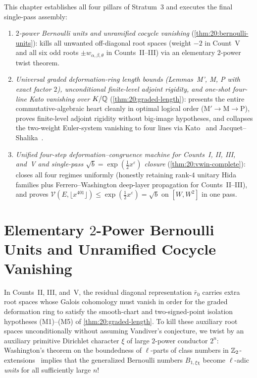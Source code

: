 This chapter establishes all four pillars of Stratum~3 and executes the final single-pass assembly:
\begin{enumerate}[label=(\roman*)]
\item \emph{$2$-power Bernoulli units and unramified cocycle vanishing} (\cref{thm:20:bernoulli-units}): kills all unwanted off-diagonal root spaces (weight $-2$ in Count~V and all six odd roots $\pm w_{\alpha, \beta, \theta}$ in Counts~II--III) via an elementary $2$-power twist theorem.
\item \emph{Universal graded deformation-ring length bounds (Lemmas~M', M, P with exact factor $2$), unconditional finite-level adjoint rigidity, and one-shot four-line Kato vanishing over $K/\mathbb{Q}$} (\cref{thm:20:graded-length}): presents the entire commutative-algebraic heart cleanly in optimal logical order ($\mathrm{M'} \to \mathrm{M} \to \mathrm{P}$), proves finite-level adjoint rigidity without big-image hypotheses, and collapses the two-weight Euler-system vanishing to four lines via Kato~\cite[Theorem~14.2(1)]{Kato2004} and Jacquet--Shalika~\cite[Theorem~1]{JacquetShalika1976}.
\item \emph{Unified four-step deformation--congruence machine for Counts~I, II, III, and~V and single-pass $\sqrt{b} = \exp(\frac{1}{2}x^\varepsilon)$ closure} (\cref{thm:20:vwin-complete}): closes all four regimes uniformly (honestly retaining rank-$4$ unitary Hida families plus Ferrero--Washington deep-layer propagation for Counts~II--III), and proves $\mathcal{V}(E, \lfloor x^{401}\rfloor) \le \exp(\frac{1}{2}x^\varepsilon) = \sqrt{b}$ on $[W, W^2]$ in one pass.
\end{enumerate}

\section{Elementary $2$-Power Bernoulli Units and Unramified Cocycle Vanishing}
\label{sec:20:bernoulli}

In Counts~II, III, and~V, the residual diagonal representation $\bar{r}_0$ carries extra root spaces whose Galois cohomology must vanish in order for the graded deformation ring to satisfy the smooth-chart and two-signed-point isolation hypotheses (M1)--(M5) of \cref{thm:20:graded-length}. To kill these auxiliary root spaces unconditionally without assuming Vandiver's conjecture, we twist by an auxiliary primitive Dirichlet character $\xi$ of large $2$-power conductor $2^n$: Washington's theorem on the boundedness of $\ell$-parts of class numbers in $\mathbb{Z}_2$-extensions~\cite{Washington1997} implies that the generalized Bernoulli numbers $B_{1, \xi\chi}$ become $\ell$-adic \emph{units} for all sufficiently large $n$!

